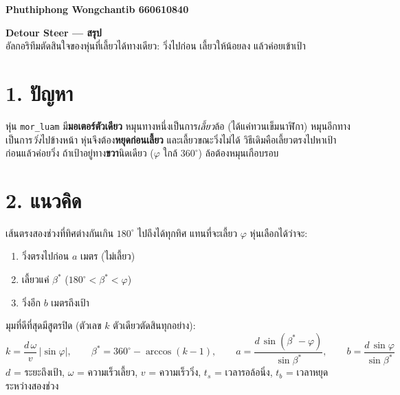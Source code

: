 \documentclass[11pt,a4paper]{article}
\begin{document}
\begin{flushright}{\small\bfseries Phuthiphong Wongchantib 660610840}\end{flushright}
\vspace{-3mm}
\begin{center}
{\Large\bfseries Detour Steer --- สรุป}\\[1mm]
อัลกอริทึมตัดสินใจของหุ่นที่เลี้ยวได้ทางเดียว: วิ่งไปก่อน เลี้ยวให้น้อยลง แล้วค่อยเข้าเป้า
\end{center}

\section*{1. ปัญหา}
หุ่น \texttt{mor\_luam} มี\textbf{มอเตอร์ตัวเดียว} หมุนทางหนึ่งเป็นการ\emph{เลี้ยว}ล้อ (ได้แค่ทวนเข็มนาฬิกา)
หมุนอีกทางเป็นการ\emph{วิ่ง}ไปข้างหน้า หุ่นจึงต้อง\textbf{หยุดก่อนเลี้ยว} และเลี้ยวขณะวิ่งไม่ได้
วิธีเดิมคือเลี้ยวตรงไปหาเป้าก่อนแล้วค่อยวิ่ง ถ้าเป้าอยู่ทาง\textbf{ขวา}นิดเดียว ($\varphi$ ใกล้ $360^\circ$)
ล้อต้องหมุนเกือบรอบ

\section*{2. แนวคิด}
เส้นตรงสองช่วงที่ทิศต่างกันเกิน $180^\circ$ ไปถึงได้ทุกทิศ แทนที่จะเลี้ยว $\varphi$ หุ่นเลือกได้ว่าจะ:
\begin{enumerate}\setlength\itemsep{0pt}
\item วิ่งตรงไปก่อน $a$ เมตร (ไม่เลี้ยว)
\item เลี้ยวแค่ $\beta^\ast$ \;($180^\circ < \beta^\ast < \varphi$)
\item วิ่งอีก $b$ เมตรถึงเป้า
\end{enumerate}
มุมที่ดีที่สุดมีสูตรปิด (ตัวเลข $k$ ตัวเดียวตัดสินทุกอย่าง):
\[
k = \frac{d\,\omega}{v}\,\lvert\sin\varphi\rvert,\qquad
\beta^\ast = 360^\circ - \arccos(k-1),\qquad
a = \frac{d\,\sin(\beta^\ast-\varphi)}{\sin\beta^\ast},\qquad
b = \frac{d\,\sin\varphi}{\sin\beta^\ast}
\]
$d$ = ระยะถึงเป้า, $\omega$ = ความเร็วเลี้ยว, $v$ = ความเร็ววิ่ง,
$t_s$ = เวลารอล้อนิ่ง, $t_b$ = เวลาหยุดระหว่างสองช่วง
\end{document}
